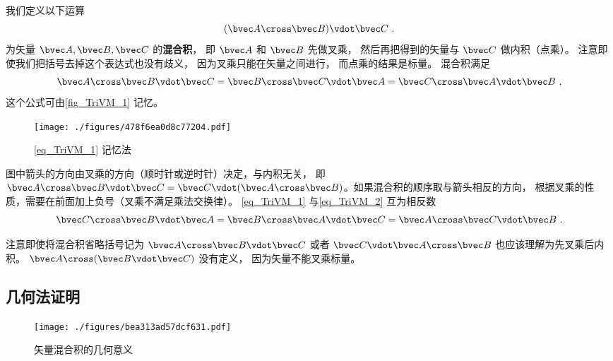 
我们定义以下运算
\begin{equation}
(\bvec A \cross \bvec B) \vdot \bvec C~.
\end{equation}
为矢量 $\bvec A, \bvec B, \bvec C$ 的\textbf{混合积}， 即 $\bvec A$ 和 $\bvec B$ 先做叉乘， 然后再把得到的矢量与 $\bvec C$ 做内积（点乘）。 注意即使我们把括号去掉这个表达式也没有歧义， 因为叉乘只能在矢量之间进行， 而点乘的结果是标量。 混合积满足
\begin{equation}\label{eq_TriVM_1}
\bvec A \cross \bvec B \vdot \bvec C = \bvec B \cross \bvec C \vdot \bvec A = \bvec C \cross \bvec A \vdot \bvec B~,
\end{equation} 
这个公式可由\autoref{fig_TriVM_1} 记忆。
\begin{figure}[ht]
\centering %
\texttt{[image: ./figures/478f6ea0d8c77204.pdf]}
\caption{\autoref{eq_TriVM_1} 记忆法}\label{fig_TriVM_1}
\end{figure}
图中箭头的方向由叉乘的方向（顺时针或逆时针）决定，与内积无关， 即 $\bvec A\cross \bvec B \vdot \bvec C = \bvec C \vdot (\bvec A \cross \bvec B)$。如果混合积的顺序取与箭头相反的方向， 根据叉乘的性质，需要在前面加上负号（叉乘不满足乘法交换律）。 \autoref{eq_TriVM_1} 与\autoref{eq_TriVM_2} 互为相反数
\begin{equation}\label{eq_TriVM_2}
\bvec C \cross \bvec B \vdot \bvec A = \bvec B \cross \bvec A \vdot \bvec C = \bvec A \cross \bvec C \vdot \bvec B~.
\end{equation}

注意即使将混合积省略括号记为 $\bvec A \cross \bvec B \vdot \bvec C$ 或者 $\bvec C \vdot \bvec A \cross \bvec B$ 也应该理解为先叉乘后内积。 $\bvec A \cross (\bvec B \vdot \bvec C)$ 没有定义， 因为矢量不能叉乘标量。

\subsection{几何法证明}

\begin{figure}[ht]
\centering
\texttt{[image: ./figures/bea313ad57dcf631.pdf]}
\caption{矢量混合积的几何意义} \label{fig_TriVM_2}
\end{figure}

